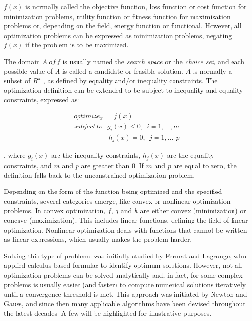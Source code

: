 $ f(x) $  is normally called the objective function, loss function or cost function for minimization problems, utility function or fitness function for maximization problems or, depending on the field, energy function or functional. However, all optimization problems can be expressed as minimization problems, negating  $ f(x) $  if the problem is to be maximized.

The domain  $ A ~ of ~ f $ is usually named the \textit{search space} or the \textit{choice set}, and each possible value of  $ A $  is called a candidate or feasible solution.  $ A $  is normally a subset of  $ R^{n} $ , as defined by equality and/or inequality constraints. The optimization definition can be extended to be subject to inequality and equality constraints, expressed as:

\begin{align}
	optimize_{x}~~~~~~~ f(x) \nonumber \\
	subject~to~~~  g_{i}(x)  \leq 0,~~ i=1,  \ldots ,m \nonumber \\
	~~~~~~~~~~~~~~~~~~~~~~~ h_{j}(x) =0,~~ j=1,  \ldots ,p
\end{align}

, where  \( g_{i}(x)  \)  are the inequality constraints,  \( h_{j}(x)  \)  are the equality constraints, and  \( m \)  and  \( p \)  are greater than 0. If  \( m \)  and  \( p \)  are equal to zero, the definition falls back to the unconstrained optimization problem.

Depending on the form of the function being optimized and the specified constraints, several categories emerge, like convex or nonlinear optimization problems. In convex optimization, $f$, $g$ and $h$ are either convex (minimization) or concave (maximization). This includes linear functions, defining the field of linear optimization. Nonlinear optimization deals with functions that cannot be written as linear expressions, which usually makes the problem harder.

Solving this type of problems was initially studied by Fermat and Lagrange, who applied calculus-based formulae to identify optimum solutions. However, not all optimization problems can be solved analytically and, in fact, for some complex problems is usually easier (and faster) to compute numerical solutions iteratively until a convergence threshold is met. This approach was initiated by Newton and Gauss, and since then many applicable algorithms have been devised throughout the latest decades. A few will be highlighted for illustrative purposes.

